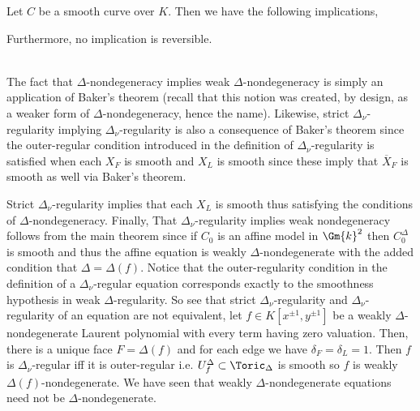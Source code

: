 \begin{prop}
Let $C$ be a smooth curve over $K$. Then we have the following implications,
\begin{center}
\end{center}
Furthermore, no implication is reversible. 
\end{prop}
\noindent\\
The fact that $\Delta$-nondegeneracy implies weak $\Delta$-nondegeneracy is simply an application of Baker's theorem (recall that this notion was created, by design, as a weaker form of $\Delta$-nondegeneracy, hence the name). Likewise, strict $\Delta_\nu$-regularity implying $\Delta_\nu$-regularity is also a consequence of Baker's theorem since the outer-regular condition introduced in the definition of $\Delta_\nu$-regularity is satisfied when each $X_F$ is smooth and $X_L$ is smooth since these imply that $\overline{X}_F$ is smooth as well via Baker's theorem. 
\par
\noindent
Strict $\Delta_\nu$-regularity implies that each $X_L$ is smooth thus satisfying the conditions of $\Delta$-nondegeneracy.
Finally, That $\Delta_\nu$-regularity implies weak nondegeneracy follows from the main theorem since if $C_0$ is an affine model in $\Gm{k}^2$ then $C_0^\Delta$ is smooth and thus the affine equation is weakly $\Delta$-nondegenerate with the added condition that $\Delta = \Delta(f)$. Notice that the outer-regularity condition in the definition of a $\Delta_\nu$-regular equation corresponds exactly to the smoothness hypothesis in weak $\Delta$-regularity. So see that strict $\Delta_\nu$-regularity and $\Delta_\nu$-regularity of an equation are not equivalent, let $f \in K[x^{\pm 1}, y^{\pm 1}]$ be a weakly $\Delta$-nondegenerate Laurent polynomial with every term having zero valuation. Then, there is a unique face $F = \Delta(f)$ and for each edge we have $\delta_F = \delta_L = 1$. Then $f$ is $\Delta_\nu$-regular iff it is outer-regular i.e. $U_f^\Delta \subset \Toric_\Delta$ is smooth so $f$ is weakly $\Delta(f)$-nondegenerate. We have seen that weakly $\Delta$-nondegenerate equations need not be $\Delta$-nondegenerate. 

